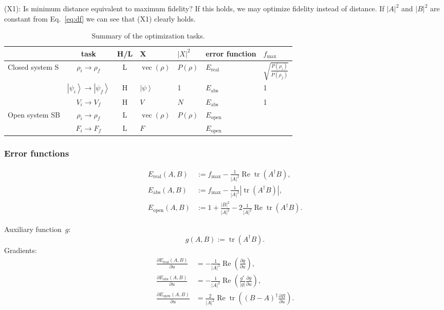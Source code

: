 \documentclass[aps, pra, a4paper, longbibliography]{revtex4}
\newcommand{\be}{\begin{equation}}
\newcommand{\ee}{\end{equation}}
\newcommand{\ket}[1]{\left| #1 \right \rangle}
\DeclareMathOperator{\tr}{tr}
\DeclareMathOperator{\re}{Re}
\DeclareMathOperator{\cvec}{vec}
\newcommand{\dd}[2]{\frac{\partial #1}{\partial #2}}
\begin{document}
(X1): Is minimum distance equivalent to maximum fidelity?
If this holds, we may optimize fidelity instead of distance.
If $|A|^2$ and $|B|^2$ are constant
from Eq.~\eqref{eq:df} we can see that (X1) clearly holds.






\begin{table}
\begin{tabular}{l|c|c|l|l|l|l}
& task & H/L & X & $|X|^2$ & error function & $f_\text{max}$\\
\hline
Closed system S
& $\rho_i \to \rho_f$ & L & $\cvec(\rho)$ & $P(\rho)$
& $E_\text{real}$ & $\sqrt{\frac{P(\rho_i)}{P(\rho_f)}}$\\
& $\ket{\psi_i} \to \ket{\psi_f}$ & H & $\ket{\psi}$ & 1 &
$E_\text{abs}$ & 1\\
& $V_i \to V_f$ & H & $V$ & $N$ & $E_\text{abs}$ & 1\\
\hline
Open system SB
& $\rho_i \to \rho_f$ & L & $\cvec(\rho)$ & $P(\rho)$ & $E_\text{open}$\\
& $F_i \to F_f$ & L & $F$ &  & $E_\text{open}$\\
\end{tabular}
\caption{Summary of the optimization tasks.}
\label{table:tasks}
\end{table}


\subsubsection{Error functions}

\begin{align}
E_\text{real}(A, B) &:= f_\text{max} -\frac{1}{|A|^2} \re \tr(A^\dagger B),\\
E_\text{abs}(A, B) &:= f_\text{max} -\frac{1}{|A|^2} |\tr(A^\dagger B)|,\\
E_\text{open}(A, B) &:= 1 +\frac{|B|^2}{|A|^2} -2 \frac{1}{|A|^2} \re \tr(A^\dagger B).
\end{align}


Auxiliary function~$g$:
\be
g(A, B) := \tr(A^\dagger B).
\ee
Gradients:
\begin{align}
\dd{E_\text{real}(A,B)}{u}
&= -\frac{1}{|A|^2} \re \left( \dd{g}{u} \right),\\
\dd{E_\text{abs}(A,B)}{u}
&= -\frac{1}{|A|^2} \re \left(\frac{g^*}{|g|} \dd{g}{u} \right),\\
\dd{E_\text{open}(A, B)}{u}
&= \frac{2}{|A|^2} \re \tr\left((B-A)^\dagger \dd{B}{u}\right).
\end{align}
\end{document}
